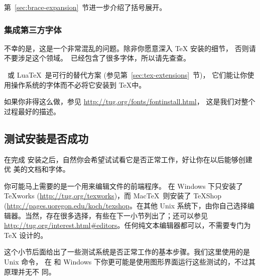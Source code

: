 \documentclass{article}
\begin{document}
第~\ref{sec:brace-expansion}~节进一步介绍了括号展开。

\subsubsection{集成第三方字体}

不幸的是，这是一个非常混乱的问题。除非你愿意深入 \TeX{} 安装的细节，
否则请不要涉足这个领域。\TL\ 已经包含了很多字体，所以请先查查。

\XeTeX\ 或 Lua\TeX\ 是可行的替代方案 (参见第~\ref{sec:tex-extensions}~节)，
它们能让你使用操作系统的字体而不必将它安装到 \TeX 中。

如果你非得这么做，参见 \url{http://tug.org/fonts/fontinstall.html}，
这是我们对整个过程最好的描述。

\subsection{测试安装是否成功}
\label{sec:test-install}

在完成 \TL{} 安装之后，自然你会希望试试看它是否正常工作，好让你在以后能够创建优
美的文档和字体。

你可能马上需要的是一个用来编辑文件的前端程序。\TL{} 在 Windows 下只安装了
\TeX{}works (\url{http://tug.org/texworks})，而 Mac\TeX\ 则安装了 TeXShop
(\url{http://pages.uoregon.edu/koch/texshop}。在其他 Unix 系统下，由你自己选择编
辑器。当然，存在很多选择，有些在下一小节列出了；还可以参见
\url{http://tug.org/interest.html#editors}。任何纯文本编辑器都可以，不需要专门为
\TeX{} 设计的。

这个小节后面给出了一些测试系统是否正常工作的基本步骤。我们这里使用的是 Unix 命令，
在 \MacOSX{} 和 Windows 下你更可能是使用图形界面运行这些测试的，不过其原理并无不
同。
\end{document}

